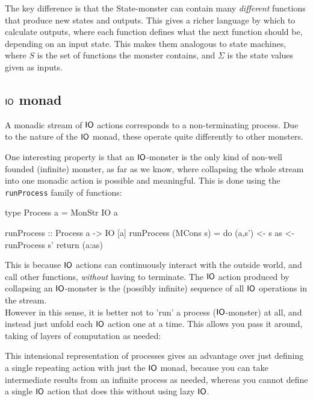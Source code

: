 The key difference is that the State-monster can contain many \emph{different} functions that produce new states and outputs. This gives a richer language by which to calculate outputs, where each function defines what the next function should be, depending on an input state. This makes them analogous to state machines, where $S$ is the set of functions the monster contains, and $\Sigma$ is the state values given as inputs.

\subsection{$\mathsf{IO}$ monad}

A monadic stream of $\mathsf{IO}$ actions corresponds to a non-terminating process. Due to the nature of the $\mathsf{IO}$ monad, these operate quite differently to other monsters.

One interesting property is that an $\mathsf{IO}$-monster is the only kind of non-well founded (infinite) monster, as far as we know, where collapsing the whole stream into one monadic action is possible and meaningful. This is done using the \verb+runProcess+ family of functions:

\begin{haskell}
type Process a = MonStr IO a

runProcess :: Process a -> IO [a]
runProcess (MCons s) = do (a,s') <- s
                          as     <- runProcess s'
                          return (a:as)
\end{haskell}

This is because $\mathsf{IO}$ actions can continuously interact with the outside world, and call other functions, \emph{without} having to terminate. The $\mathsf{IO}$ action produced by collapsing an $\mathsf{IO}$-monster is the (possibly infinite) sequence of all $\mathsf{IO}$ operations in the stream. \\

However in this sense, it is better not to 'run' a process ($\mathsf{IO}$-monster) at all, and instead just unfold each $\mathsf{IO}$ action one at a time. This allows you pass it around, taking of layers of computation as needed:

This intensional representation of processes gives an advantage over just defining a single repeating action with just the $\mathsf{IO}$ monad, because you can take intermediate results from an infinite process as needed, whereas you cannot define a single $\mathsf{IO}$ action that does this without using lazy $\mathsf{IO}$.

